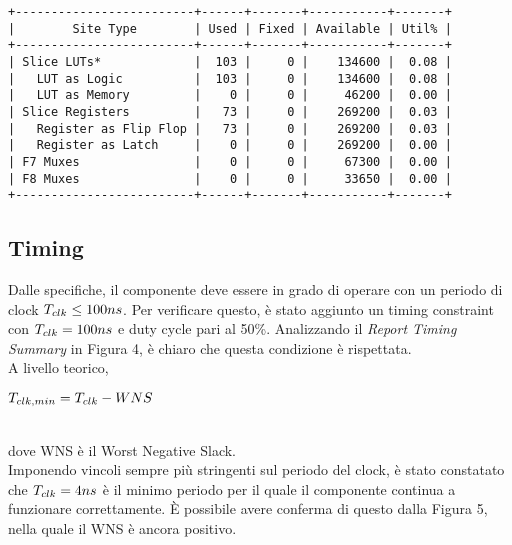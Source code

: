 \documentclass{article}
\begin{document}
\begin{center}
\verb|+-------------------------+------+-------+-----------+-------+|\nopagebreak\\
\verb=|        Site Type        | Used | Fixed | Available | Util% |=\nopagebreak\\
\verb=+-------------------------+------+-------+-----------+-------+=\nopagebreak\\
\verb=| Slice LUTs*             |  103 |     0 |    134600 |  0.08 |=\nopagebreak\\
\verb=|   LUT as Logic          |  103 |     0 |    134600 |  0.08 |=\nopagebreak\\
\verb=|   LUT as Memory         |    0 |     0 |     46200 |  0.00 |=\nopagebreak\\
\verb=| Slice Registers         |   73 |     0 |    269200 |  0.03 |=\nopagebreak\\
\verb=|   Register as Flip Flop |   73 |     0 |    269200 |  0.03 |=\nopagebreak\\
\verb=|   Register as Latch     |    0 |     0 |    269200 |  0.00 |=\nopagebreak\\
\verb=| F7 Muxes                |    0 |     0 |     67300 |  0.00 |=\nopagebreak\\
\verb=| F8 Muxes                |    0 |     0 |     33650 |  0.00 |=\nopagebreak\\
\verb|+-------------------------+------+-------+-----------+-------+|\nopagebreak\\
\end{center}

\subsection{Timing}
Dalle specifiche, il componente deve essere in grado di operare con un periodo di clock $T_{\small{clk}} \le 100ns$. Per verificare questo, è stato aggiunto un timing constraint con $T_{\small{clk}} = 100ns$ e duty cycle pari al 50\%.
Analizzando il \emph{Report Timing Summary} in Figura 4, è chiaro che questa condizione è rispettata.
\\
A livello teorico,
\begin{center}
    $T_{\small{clk, min}} = T_{\small{clk}} - WNS$
\end{center}
\\dove WNS è il Worst Negative Slack.
\\Imponendo vincoli sempre più stringenti sul periodo del clock, è stato constatato che $T_{\small{clk}} = 4ns$ è il minimo periodo per il quale il componente continua a funzionare correttamente.
È possibile avere conferma di questo dalla Figura 5, nella quale il WNS è ancora positivo.
\end{document}

